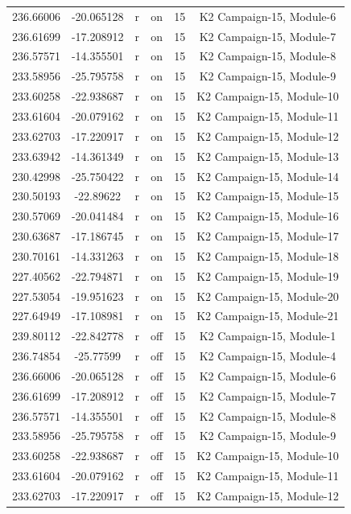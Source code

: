 \documentclass[11pt]{article}
\begin{document}
\begin{center}
\begin{longtable}{|c|c|c|c|c|c|}
236.66006 & -20.065128 & r & on &15 & K2 Campaign-15, Module-6\\
236.61699 & -17.208912 & r & on &15 & K2 Campaign-15, Module-7\\
236.57571 & -14.355501 & r & on &15 & K2 Campaign-15, Module-8\\
233.58956 & -25.795758 & r & on &15 & K2 Campaign-15, Module-9\\
233.60258 & -22.938687 & r & on &15 & K2 Campaign-15, Module-10\\
233.61604 & -20.079162 & r & on &15 & K2 Campaign-15, Module-11\\
233.62703 & -17.220917 & r & on &15 & K2 Campaign-15, Module-12\\
233.63942 & -14.361349 & r & on &15 & K2 Campaign-15, Module-13\\
230.42998 & -25.750422 & r & on &15 & K2 Campaign-15, Module-14\\
230.50193 & -22.89622 & r & on &15 & K2 Campaign-15, Module-15\\
230.57069 & -20.041484 & r & on &15 & K2 Campaign-15, Module-16\\
230.63687 & -17.186745 & r & on &15 & K2 Campaign-15, Module-17\\
230.70161 & -14.331263 & r & on &15 & K2 Campaign-15, Module-18\\
227.40562 & -22.794871 & r & on &15 & K2 Campaign-15, Module-19\\
227.53054 & -19.951623 & r & on &15 & K2 Campaign-15, Module-20\\
227.64949 & -17.108981 & r & on &15 & K2 Campaign-15, Module-21\\
239.80112 & -22.842778 & r & off &15 & K2 Campaign-15, Module-1\\
236.74854 & -25.77599 & r & off &15 & K2 Campaign-15, Module-4\\
236.66006 & -20.065128 & r & off &15 & K2 Campaign-15, Module-6\\
236.61699 & -17.208912 & r & off &15 & K2 Campaign-15, Module-7\\
236.57571 & -14.355501 & r & off &15 & K2 Campaign-15, Module-8\\
233.58956 & -25.795758 & r & off &15 & K2 Campaign-15, Module-9\\
233.60258 & -22.938687 & r & off &15 & K2 Campaign-15, Module-10\\
233.61604 & -20.079162 & r & off &15 & K2 Campaign-15, Module-11\\
233.62703 & -17.220917 & r & off &15 & K2 Campaign-15, Module-12\\

\end{longtable}
\end{center}
\end{document}
